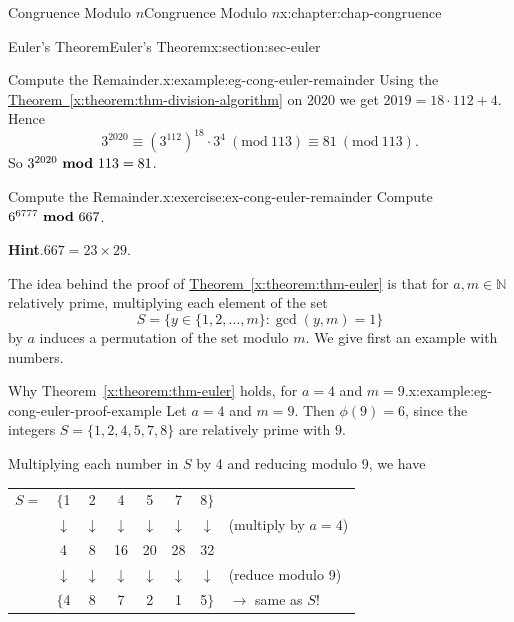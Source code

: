 \documentclass[oneside,10pt,]{book}
\newcommand{\blocktitlefont}{\relax}
\newcommand{\tabularfont}{\relax}
\newcommand{\xreffont}{\relax}
\numberwithin{equation}{section}
\newcommand{\Mod}[1]{\ \left(\mathrm{mod}\ #1\right)}
\newcommand{\mmod}[1]{\ \mathrm{\bf mod}\ #1}
\begin{document}
\begin{chapterptx}{Congruence Modulo \(n\)}{}{Congruence Modulo \(n\)}{}{}{x:chapter:chap-congruence}
\begin{sectionptx}{Euler's Theorem}{}{Euler's Theorem}{}{}{x:section:sec-euler}
\begin{example}{Compute the Remainder.}{x:example:eg-cong-euler-remainder}
Using the \hyperref[x:theorem:thm-division-algorithm]{Theorem~{\xreffont\ref{x:theorem:thm-division-algorithm}}} on 2020 we get \(2019 = 18\cdot 112 + 4\). Hence%
\begin{equation*}
3^{2020} \equiv (3^{112})^{18} \cdot 3^4 \Mod{113} \equiv 81 \Mod{113}\text{.}
\end{equation*}
So \(3^{2020} \mmod 113 = 81\).%
\end{example}
\begin{inlineexercise}{Compute the Remainder.}{x:exercise:ex-cong-euler-remainder}%
Compute \(6^{6777} \mmod 667\).%
\par\smallskip%
\noindent\textbf{\blocktitlefont Hint}.\hypertarget{g:hint:id457837}{}\quad{}\(667 = 23 \times 29.\)%
\end{inlineexercise}
The idea behind the proof of \hyperref[x:theorem:thm-euler]{Theorem~{\xreffont\ref{x:theorem:thm-euler}}} is that for \(a,m \in \mathbb{N}\) relatively prime, multiplying each element of the set%
\begin{equation*}
S = \{y \in \{1,2,\ldots,m\} : \gcd(y,m) = 1\}
\end{equation*}
by \(a\) induces a permutation of the set modulo \(m\). We give first an example with numbers.%
\begin{example}{Why Theorem~{\xreffont\ref*{x:theorem:thm-euler}} holds, for \(a = 4\) and \(m = 9\).}{x:example:eg-cong-euler-proof-example}%
Let \(a = 4\) and \(m = 9\). Then \(\phi(9) = 6\), since the integers \(S = \{1,2,4,5,7,8\}\) are relatively prime with \(9\).%
\par
Multiplying each number in \(S\) by 4 and reducing modulo 9, we have%
\begin{sidebyside}{1}{0.125}{0.125}{0}%
\begin{sbspanel}{0.75}%
{\centering%
{\tabularfont%
\begin{tabular}{cccccccc}
\multicolumn{1}{r}{\(S = \)}&\(\{\)1&2&4&5&7&8\(\}\)&\multicolumn{1}{l}{}\tabularnewline[0pt]
\multicolumn{1}{r}{}&\(\downarrow\)&\(\downarrow\)&\(\downarrow\)&\(\downarrow\)&\(\downarrow\)&\(\downarrow\)&\multicolumn{1}{l}{(multiply by \(a = 4\))}\tabularnewline[0pt]
\multicolumn{1}{r}{}&4&8&16&20&28&32&\multicolumn{1}{l}{}\tabularnewline[0pt]
\multicolumn{1}{r}{}&\(\downarrow\)&\(\downarrow\)&\(\downarrow\)&\(\downarrow\)&\(\downarrow\)&\(\downarrow\)&\multicolumn{1}{l}{(reduce modulo 9)}\tabularnewline[0pt]
\multicolumn{1}{r}{}&\(\{\)4&8&7&2&1&5\(\}\)&\multicolumn{1}{l}{\(\rightarrow\) same as \(S\)!}
\end{tabular}
}}
\end{sbspanel}
\end{sidebyside}
\end{example}
\end{sectionptx}
\end{chapterptx}
\end{document}
